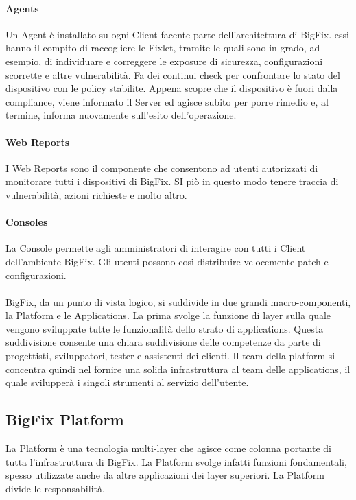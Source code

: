 \paragraph{Agents}
Un Agent è installato su ogni Client facente parte dell'architettura di BigFix. essi hanno il compito di raccogliere le Fixlet, tramite le quali sono in grado, ad esempio, di individuare e correggere le exposure di sicurezza, configurazioni scorrette e altre vulnerabilità. Fa dei continui check per confrontare lo stato del dispositivo con le policy stabilite. Appena scopre che il dispositivo è fuori dalla compliance, viene informato il Server ed agisce subito per porre rimedio e, al termine, informa nuovamente sull'esito dell'operazione.
\paragraph{Web Reports}
I Web Reports sono il componente che consentono ad utenti autorizzati di monitorare tutti i dispositivi di BigFix. SI piò in questo modo tenere traccia di vulnerabilità, azioni richieste e molto altro.
\paragraph{Consoles}
La Console permette agli amministratori di interagire con tutti i Client dell'ambiente BigFix. Gli utenti possono così distribuire velocemente patch e configurazioni.
\paragraph{}
BigFix, da un punto di vista logico, si suddivide in due grandi macro-componenti, la Platform e le Applications. La prima svolge la funzione di layer sulla quale vengono sviluppate tutte le funzionalità dello strato di applications. Questa suddivisione consente una chiara suddivisione delle competenze da parte di progettisti, sviluppatori, tester e assistenti dei clienti. Il team della platform si concentra quindi nel fornire una solida infrastruttura al team delle applications, il quale svilupperà i singoli strumenti al servizio dell'utente.
\subsection{BigFix Platform}
La Platform è una tecnologia multi-layer che agisce come colonna portante di tutta l'infrastruttura di BigFix. La Platform svolge infatti funzioni fondamentali, spesso utilizzate anche da altre applicazioni dei layer superiori. La Platform divide le responsabilità.
